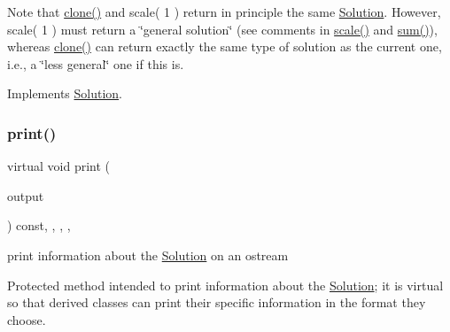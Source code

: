 Note that \mbox{\hyperlink{class_s_m_spp__di__unipi__it_1_1_m_c_f_solution_a0bf2bed8ce0c86fbf2a3c7a312d3462a}{clone()}} and scale( 1 ) return in principle the same \mbox{\hyperlink{class_s_m_spp__di__unipi__it_1_1_solution}{Solution}}. However, scale( 1 ) must return a \char`\"{}general solution\char`\"{} (see comments in \mbox{\hyperlink{class_s_m_spp__di__unipi__it_1_1_m_c_f_solution_a2c818cbb6d8b22f839a7f7336f6b382b}{scale()}} and \mbox{\hyperlink{class_s_m_spp__di__unipi__it_1_1_m_c_f_solution_ac91491316467fa9925f2c8e8fc08f4c1}{sum()}}), whereas \mbox{\hyperlink{class_s_m_spp__di__unipi__it_1_1_m_c_f_solution_a0bf2bed8ce0c86fbf2a3c7a312d3462a}{clone()}} can return exactly the same type of solution as the current one, i.\+e., a \char`\"{}less general\char`\"{} one if this is. 

Implements \mbox{\hyperlink{class_s_m_spp__di__unipi__it_1_1_solution_a02ecf9046100701d7bcc800deaa5717b}{Solution}}.

\mbox{\label{class_s_m_spp__di__unipi__it_1_1_m_c_f_solution_a617885c1d228e0ca67bbb0efdbe713e3}} 
\subsubsection{\texorpdfstring{print()}{print()}}
{\footnotesize\ttfamily virtual void print (\begin{DoxyParamCaption}\item[{std\+::ostream \&}]{output }\end{DoxyParamCaption}) const\hspace{0.3cm}{\ttfamily [inline]}, {\ttfamily [final]}, {\ttfamily [override]}, {\ttfamily [protected]}, {\ttfamily [virtual]}}



print information about the \mbox{\hyperlink{class_s_m_spp__di__unipi__it_1_1_solution}{Solution}} on an ostream 

Protected method intended to print information about the \mbox{\hyperlink{class_s_m_spp__di__unipi__it_1_1_solution}{Solution}}; it is virtual so that derived classes can print their specific information in the format they choose. 

